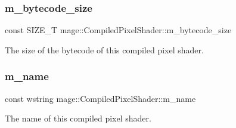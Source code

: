 \subsubsection{\texorpdfstring{m\+\_\+bytecode\+\_\+size}{m\_bytecode\_size}}
{\footnotesize\ttfamily const S\+I\+Z\+E\+\_\+T mage\+::\+Compiled\+Pixel\+Shader\+::m\+\_\+bytecode\+\_\+size}

The size of the bytecode of this compiled pixel shader. \hypertarget{structmage_1_1_compiled_pixel_shader_ae87a10c9288429db9a607182a0ef2b39}{}\label{structmage_1_1_compiled_pixel_shader_ae87a10c9288429db9a607182a0ef2b39} 
\subsubsection{\texorpdfstring{m\+\_\+name}{m\_name}}
{\footnotesize\ttfamily const wstring mage\+::\+Compiled\+Pixel\+Shader\+::m\+\_\+name}

The name of this compiled pixel shader. 